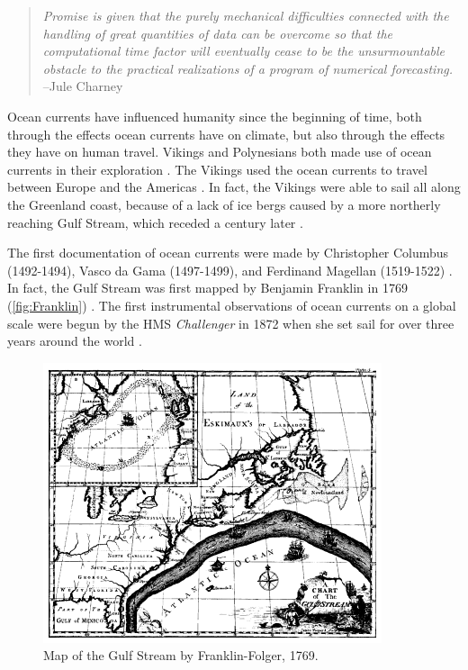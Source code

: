 \begin{quote}
\emph{Promise is given that the purely mechanical difficulties connected with the
handling of great quantities of data can be overcome so that the computational
time factor will eventually cease to be the unsurmountable obstacle to the
practical realizations of a program of numerical forecasting.} --Jule Charney
\end{quote}

Ocean currents have influenced humanity since the beginning of time, both
through the effects ocean currents have on climate, but also through the effects
they have on human travel. Vikings and Polynesians both made use of ocean
currents in their exploration \cite{Dijkstra08, Ingstad}. The Vikings used the
ocean currents to travel between Europe and the Americas \cite{Ingstad}. In
fact, the Vikings were able to sail all along the Greenland coast, because of a
lack of ice bergs caused by a more northerly reaching Gulf Stream, which receded
a century later \cite{Morner95}.

The first documentation of ocean currents were made by Christopher Columbus
(1492-1494), Vasco da Gama (1497-1499), and Ferdinand Magellan (1519-1522)
\cite{Dijkstra08, Vallis06}. In fact, the Gulf Stream was first mapped by
Benjamin Franklin in 1769 (\autoref{fig:Franklin}) \cite{Dijkstra08, Vallis06}.
The first instrumental observations of ocean currents on a global scale were
begun by the HMS \emph{Challenger} in 1872 when she set sail for over three
years around the world \cite{Siedler01}.

\begin{figure}%
  \begin{center}
    \includegraphics[scale=0.5]{Figures/Franklin-Folger.png}
    \caption{Map of the Gulf Stream by Franklin-Folger, 1769.}
    \label{fig:Franklin}
  \end{center}
\end{figure}

